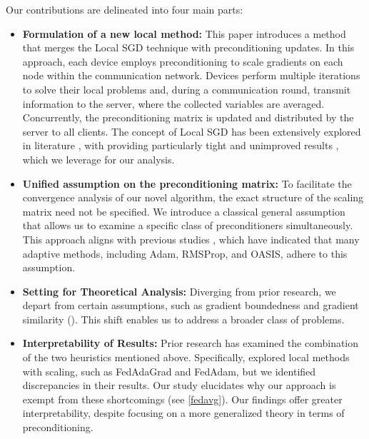 \documentclass[sn-mathphys,Numbered]{sn-jnl}%
\renewcommand{\|}{\parallel}
\renewcommand {\*} {\ast}
\begin{document}
Our contributions are delineated into four main parts:
 \begin{itemize}
\item 
{\bf Formulation of a new local method:} This paper introduces a method that merges the Local SGD technique with preconditioning updates. In this approach, each device employs preconditioning to scale gradients on each node within the communication network. Devices perform multiple iterations to solve their local problems and, during a communication round, transmit information to the server, where the collected variables are averaged. Concurrently, the preconditioning matrix is updated and distributed by the server to all clients. The concept of Local SGD has been extensively explored in literature \cite{konevcny2016federated, stich2018local, khaled2020tighter, koloskova2020unified, beznosikov2022decentralized}, with \cite{khaled2020tighter} providing particularly tight and unimproved results \cite{glasgow2022sharp}, which we leverage for our analysis.

\item 
{\bf Unified assumption on the preconditioning matrix:} To facilitate the convergence analysis of our novel algorithm, the exact structure of the scaling matrix need not be specified. We introduce a classical general assumption that allows us to examine a specific class of preconditioners simultaneously. This approach aligns with previous studies \cite{sadiev2022stochastic,beznosikov2022scaled}, which have indicated that many adaptive methods, including Adam, RMSProp, and OASIS, adhere to this assumption.

\item 
{\bf Setting for Theoretical Analysis: }Diverging from prior research, we depart from certain assumptions, such as gradient boundedness and gradient similarity (\cite[Assumptions 2 and 3]{reddi2020adaptive}). This shift enables us to address a broader class of problems.

\item 
{\bf Interpretability of Results:} Prior research has examined the combination of the two heuristics mentioned above. Specifically, \cite{reddi2020adaptive} explored local methods with scaling, such as FedAdaGrad and FedAdam, but we identified discrepancies in their results. Our study elucidates why our approach is exempt from these shortcomings (see \cref{fedavg}). 
Our findings offer greater interpretability, despite focusing on a more generalized theory in terms of preconditioning.




 \end{itemize}
\end{document}
